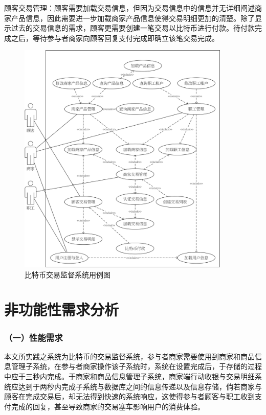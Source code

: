 顾客交易管理：顾客需要加载交易信息，但因为交易信息中的信息并无详细阐述商家产品信息，因此需要进一步加载商家产品信息使得交易明细更加的清楚。除了显示过去的交易信息的需求，顾客更需要创建一笔交易以⽐特币进⾏付款。待付款完成之后，等待参与者商家向顾客回复⽀付完成即确立该笔交易完成。

	\begin{figure}[!htbp]
	\centering
	\includegraphics[width = 0.9\textwidth]{UC.jpg}
	\caption{比特币交易监督系统⽤例图}\label{UC}
	\end{figure}

	\section{非功能性需求分析}

	\subsubsection{（一）性能需求}
	
	本文所实践之系统为比特币的交易监督系统，参与者商家需要使用到商家和商品信息管理子系统，在参与者商家操作该子系统时，系统在设置完成后，于存储的过程中应于三秒内完成。于商家和商品信息管理子系统，商家端行动收银与交易明细系统应达到于两秒内完成子系统与数据库之间的信息传递以及信息存储，倘若商家与顾客在完成交易后，却无法得到快速的系统响应，这使得参与者顾客与职工收到⽀付完成的回复，甚至导致商家的交易塞车影响用户的消费体验。

